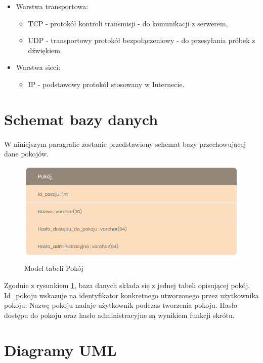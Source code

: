 \documentclass{article}
\begin{document}
\begin{itemize}
\begin{itemize}
				
				
				
				
		\end{itemize}	
		
		\item Warstwa transportowa:
		\begin{itemize}
			\item TCP - protokół kontroli transmisji - do komunikacji z serwerem,
			\item UDP - transportowy protokół bezpołączeniowy - do przesyłania próbek z dźwiękiem.
		\end{itemize}
		\item Warstwa sieci:
		\begin{itemize}
			\item IP - podstawowy protokół stosowany w Internecie.
		\end{itemize}
	\end{itemize}
	\section{Schemat bazy danych} 
	\paragraph{} W niniejszym paragrafie zostanie przedstawiony schemat bazy przechowującej dane pokojów.
	\begin{figure}[h]
		\centering
		\includegraphics[scale=0.7]{BD}
		\caption[]{Model tabeli Pokój}
		\label{fig:BD}
	\end{figure}

	Zgodnie z rysunkiem \ref{fig:BD}, baza danych składa się z jednej tabeli opisującej pokój. Id\_pokoju wskazuje na identyfikator konkretnego utworzonego przez użytkownika pokoju. Nazwę pokoju nadaje użytkownik podczas tworzenia pokoju. Hasło dostępu do pokoju oraz hasło administracyjne są wynikiem funkcji skrótu. 
	\section{Diagramy UML}
\end{document}

